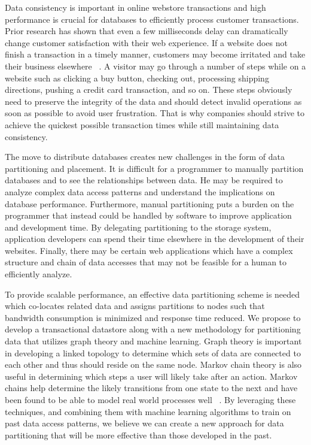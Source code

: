 \documentclass[10pt,final,journal]{IEEEtran}
\begin{document}
Data consistency is important in online webstore transactions and high performance is crucial for databases to efficiently process customer transactions. Prior research has shown that even a few milliseconds delay can dramatically change customer satisfaction with their web experience. If a website does not finish a transaction in a timely manner, customers may become irritated and take their business elsewhere ~\cite{Ramsay:1998}. A visitor may go through a number of steps while on a website such as clicking a buy button, checking out, processing shipping directions, pushing a credit card transaction, and so on. These steps obviously need to preserve the integrity of the data and should detect invalid operations as soon as possible to avoid user frustration. That is why companies should strive to achieve the quickest possible transaction times while still maintaining data consistency.

The move to distribute databases creates new challenges in the form of data partitioning and placement. It is difficult for a programmer to manually partition databases and to see the relationships between data. He may be required to analyze complex data access patterns and understand the implications on database performance. Furthermore, manual partitioning puts a burden on the programmer that instead could be handled by software to improve application and development time. By delegating partitioning to the storage system, application developers can spend their time elsewhere in the development of their websites. Finally, there may be certain web applications which have a complex structure and chain of data accesses that may not be feasible for a human to efficiently analyze.

To provide scalable performance, an effective data partitioning scheme is needed which co-locates related data and assigns partitions to nodes such that bandwidth consumption is minimized and response time reduced. We propose to develop a transactional datastore along with a new methodology for partitioning data that utilizes graph theory and machine learning. Graph theory is important in developing a linked topology to determine which sets of data are connected to each other and thus should reside on the same node. Markov chain theory is also useful in determining which steps a user will likely take after an action. Markov chains help determine the likely transitions from one state to the next and have been found to be able to model real world processes well ~\cite{Gilks:1996}. By leveraging these techniques, and combining them with machine learning algorithms to train on past data access patterns, we believe we can create a new approach for data partitioning that will be more effective than those developed in the past.
\end{document}
